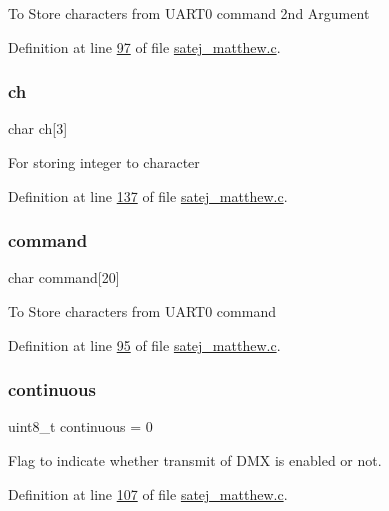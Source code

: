 To Store characters from U\+A\+R\+T0 command 2nd Argument 

Definition at line \mbox{\hyperlink{satej__matthew_8c_source_l00097}{97}} of file \mbox{\hyperlink{satej__matthew_8c_source}{satej\+\_\+matthew.\+c}}.

\mbox{\label{satej__matthew_8c_afd57a52a89b95928a54f8a6175a10486}} 
\subsubsection{\texorpdfstring{ch}{ch}}
{\footnotesize\ttfamily char ch\mbox{[}3\mbox{]}}

For storing integer to character 

Definition at line \mbox{\hyperlink{satej__matthew_8c_source_l00137}{137}} of file \mbox{\hyperlink{satej__matthew_8c_source}{satej\+\_\+matthew.\+c}}.

\mbox{\label{satej__matthew_8c_ab36a1cdf1f08575764a5aa3691b93f6f}} 
\subsubsection{\texorpdfstring{command}{command}}
{\footnotesize\ttfamily char command\mbox{[}20\mbox{]}}

To Store characters from U\+A\+R\+T0 command 

Definition at line \mbox{\hyperlink{satej__matthew_8c_source_l00095}{95}} of file \mbox{\hyperlink{satej__matthew_8c_source}{satej\+\_\+matthew.\+c}}.

\mbox{\label{satej__matthew_8c_ad9818a836c7c4d1d49d907c9fb916d83}} 
\subsubsection{\texorpdfstring{continuous}{continuous}}
{\footnotesize\ttfamily uint8\+\_\+t continuous = 0}

Flag to indicate whether transmit of D\+MX is enabled or not. 

Definition at line \mbox{\hyperlink{satej__matthew_8c_source_l00107}{107}} of file \mbox{\hyperlink{satej__matthew_8c_source}{satej\+\_\+matthew.\+c}}.

